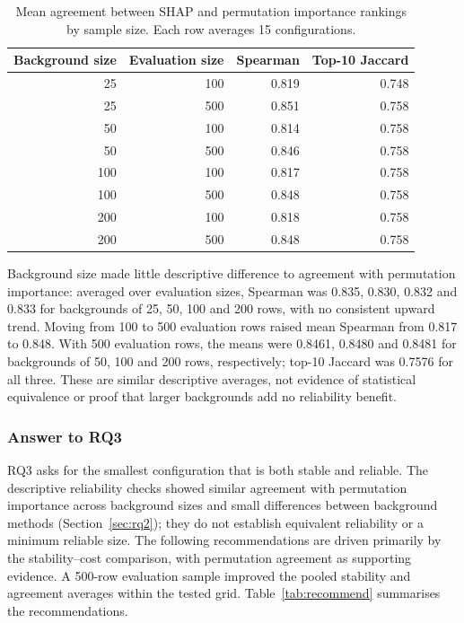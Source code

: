 \documentclass[11pt,a4paper]{article}
\begin{document}
\begin{table}[htbp]
\centering\small
\caption{Mean agreement between SHAP and permutation importance rankings by sample size. Each row averages 15 configurations.}
\label{tab:rq2-size-agreement}
\begin{tabular}{r r r r}
\toprule
Background size & Evaluation size & Spearman & Top-10 Jaccard \\
\midrule
25 & 100 & 0.819 & 0.748 \\
25 & 500 & 0.851 & 0.758 \\
50 & 100 & 0.814 & 0.758 \\
50 & 500 & 0.846 & 0.758 \\
100 & 100 & 0.817 & 0.758 \\
100 & 500 & 0.848 & 0.758 \\
200 & 100 & 0.818 & 0.758 \\
200 & 500 & 0.848 & 0.758 \\
\bottomrule
\end{tabular}
\end{table}

Background size made little descriptive difference to agreement with permutation importance: averaged over evaluation sizes, Spearman was 0.835, 0.830, 0.832 and 0.833 for backgrounds of 25, 50, 100 and 200 rows, with no consistent upward trend. Moving from 100 to 500 evaluation rows raised mean Spearman from 0.817 to 0.848. With 500 evaluation rows, the means were 0.8461, 0.8480 and 0.8481 for backgrounds of 50, 100 and 200 rows, respectively; top-10 Jaccard was 0.7576 for all three. These are similar descriptive averages, not evidence of statistical equivalence or proof that larger backgrounds add no reliability benefit.

\subsubsection{Answer to RQ3}

RQ3 asks for the smallest configuration that is both stable and reliable. The descriptive reliability checks showed similar agreement with permutation importance across background sizes and small differences between background methods (Section~\ref{sec:rq2}); they do not establish equivalent reliability or a minimum reliable size. The following recommendations are driven primarily by the stability--cost comparison, with permutation agreement as supporting evidence. A 500-row evaluation sample improved the pooled stability and agreement averages within the tested grid. Table~\ref{tab:recommend} summarises the recommendations.
\end{document}
